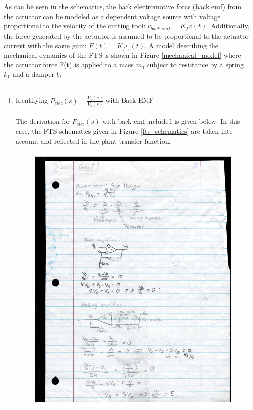 \documentclass[a4paper, titlepage, 12pt]{article}
\begin{document}
		As can be seen in the schematics, the back electromotive force (back emf)
		from the actuator can be modeled as a dependent voltage source with voltage
		proportional to the velocity of the cutting tool: $v_{back\_emf} = K_f\dot{x}(t)$.
		Additionally, the force generated by the actuator is assumed to be proportional
		to the actuator current with the same gain: $F(t) = K_fi_c(t)$. A model
		describing the mechanical dynamics of the FTS is shown in Figure
		\ref{mechanical_model} where the actuator force F(t) is applied to a mass
		$m_1$ subject to resistance by a spring $k_1$ and a damper $b_1$. \\\\
		\begin{enumerate}
			\item Identifying $P_{elec}(s) = \frac{V_s(s)}{V_c(s)}$ with Back EMF \\\\
			The derivation for $P_{elec}(s)$ with back emf included is given below.
			In this case, the FTS schematics given in Figure \ref{fts_schematics}
			are taken into account and reflected in the plant transfer function.
			\begin{figure}[H]
				\centering
				\includegraphics[width=\linewidth]{images/p_elec_emf_1.jpg}

\end{figure}
\end{enumerate}
\end{document}
